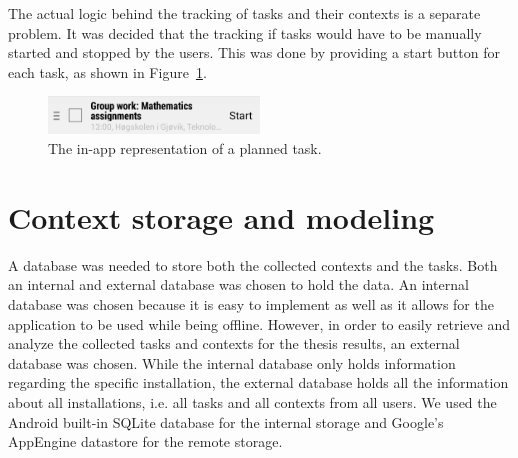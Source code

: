 The actual logic behind the tracking of tasks and their contexts is a separate problem. It was decided that the tracking if tasks would have to be manually started and stopped by the users. This was done by providing a start button for each task, as shown in Figure~\ref{fig:taskrepresentation}.
\begin{figure}[tbp]
  \centering
  \includegraphics[width=0.5\textwidth]{figures/TaskRepresentation.png}
  \caption[In-app representation of task]{The in-app representation of a planned task.}
  \label{fig:taskrepresentation}
\end{figure}

\section{Context storage and modeling}
A database was needed to store both the collected contexts and the tasks. Both an internal and external database was chosen to hold the data. An internal database was chosen because it is easy to implement as well as it allows for the application to be used while being offline. However, in order to easily retrieve and analyze the collected tasks and contexts for the thesis results, an external database was chosen. While the internal database only holds information regarding the specific installation, the external database holds all the information about all installations, i.e. all tasks and all contexts from all users. We used the Android built-in SQLite database for the internal storage and Google's AppEngine datastore for the remote storage.


